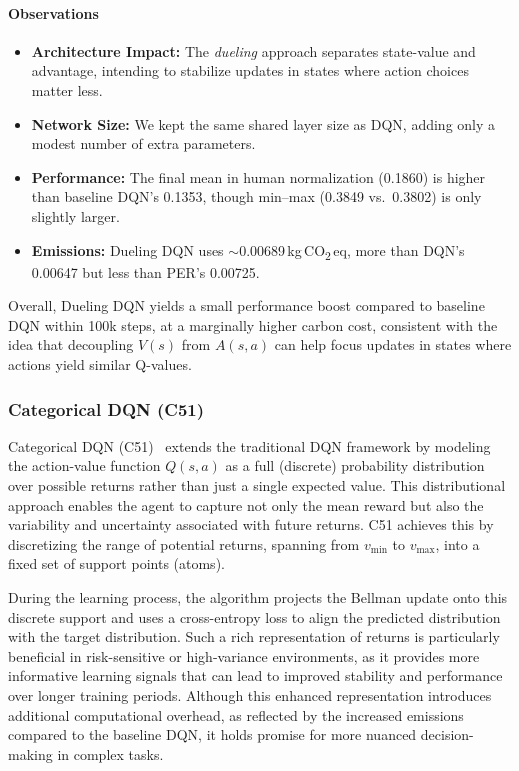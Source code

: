 \paragraph{Observations}
\begin{itemize}
	\item \textbf{Architecture Impact:}
	The \emph{dueling} approach separates state-value and advantage,
	intending to stabilize updates in states where action choices matter less.
	\item \textbf{Network Size:}
	We kept the same shared layer size as DQN, adding only a modest number of extra parameters.
	\item \textbf{Performance:}
	The final mean in human normalization (0.1860) is higher than baseline DQN's 0.1353,
	though min--max (0.3849 vs.\ 0.3802) is only slightly larger.
	\item \textbf{Emissions:}
	Dueling DQN uses $\sim$\num{0.00689}\,kg\,CO\textsubscript{2}\,eq,
	more than DQN's 0.00647 but less than PER's 0.00725.
\end{itemize}

Overall, Dueling DQN yields a small performance boost compared to baseline DQN 
within 100k steps, at a marginally higher carbon cost, consistent with the idea 
that decoupling $V(s)$ from $A(s,a)$ can help focus updates in states 
where actions yield similar Q-values.

\subsubsection{Categorical DQN (C51)}
\label{subsubsec:c51}
Categorical DQN (C51)~\cite{bellemare:distributional} extends the traditional DQN framework by modeling the action-value function $Q(s,a)$ as a full (discrete) probability distribution over possible returns rather than just a single expected value. This distributional approach enables the agent to capture not only the mean reward but also the variability and uncertainty associated with future returns. C51 achieves this by discretizing the range of potential returns, spanning from $v_{\mathrm{min}}$ to $v_{\mathrm{max}}$, into a fixed set of support points (atoms).

During the learning process, the algorithm projects the Bellman update onto this discrete support and uses a cross-entropy loss to align the predicted distribution with the target distribution. Such a rich representation of returns is particularly beneficial in risk-sensitive or high-variance environments, as it provides more informative learning signals that can lead to improved stability and performance over longer training periods. Although this enhanced representation introduces additional computational overhead, as reflected by the increased emissions compared to the baseline DQN, it holds promise for more nuanced decision-making in complex tasks.

